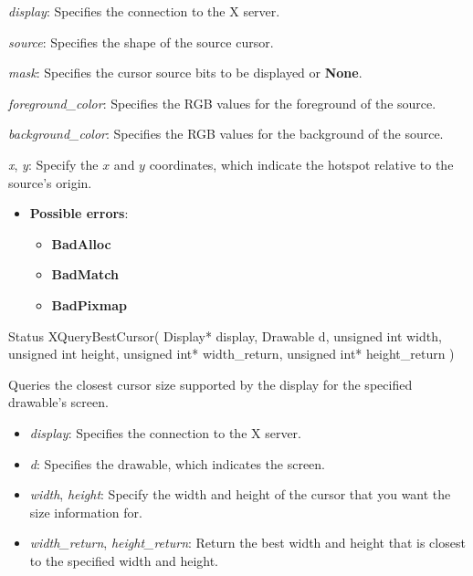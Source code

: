 \documentclass{report}
\begin{document}
\begin{itemize}
            \begin{description}
                \item \textit{display}: Specifies the connection to the X server.
                \item \textit{source}: Specifies the shape of the source cursor.
                \item \textit{mask}: Specifies the cursor source bits to be displayed or \textbf{None}.
                \item \textit{foreground\_color}: Specifies the RGB values for the foreground of the source.
                \item \textit{background\_color}: Specifies the RGB values for the background of the source.
                \item \textit{x}, \textit{y}: Specify the $x$ and $y$ coordinates, which indicate the hotspot relative to the source's origin.
            \end{description}

            \begin{itemize}
                \item \textbf{Possible errors}:
                    \begin{itemize}
                        \item \textbf{BadAlloc}
                        \item \textbf{BadMatch}
                        \item \textbf{BadPixmap}
                    \end{itemize}
            \end{itemize}

            \begin{cppcode}
                Status XQueryBestCursor(
                    Display* display,
                    Drawable d,
                    unsigned int width,
                    unsigned int height,
                    unsigned int* width_return,
                    unsigned int* height_return
                )
            \end{cppcode}
            \bigbreak \noindent
            Queries the closest cursor size supported by the display for the specified drawable's screen.

            \begin{itemize}
                \item \textit{display}: Specifies the connection to the X server.
                \item \textit{d}: Specifies the drawable, which indicates the screen.
                \item \textit{width}, \textit{height}: Specify the width and height of the cursor that you want the size information for.
                \item \textit{width\_return}, \textit{height\_return}: Return the best width and height that is closest to the specified width and height.
            \end{itemize}


\end{itemize}
\end{document}
